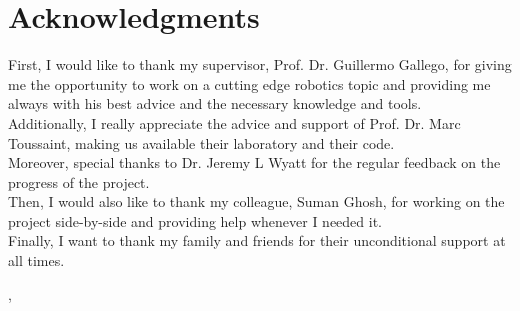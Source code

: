 \chapter*{Acknowledgments}

First, I would like to thank my supervisor, Prof. Dr. Guillermo Gallego, for giving me the opportunity to work on a cutting edge robotics topic and providing me always with his best advice and the necessary knowledge and tools.\\

Additionally, I really appreciate the advice and support of Prof. Dr. Marc Toussaint, making us available their laboratory and their code.\\

Moreover, special thanks to Dr. Jeremy L Wyatt for the regular feedback on the progress of the project.\\

Then, I would also like to thank my colleague, Suman Ghosh, for working on the project side-by-side and providing help whenever I needed it.\\

Finally, I want to thank my family and friends for their unconditional support at all times.

\vspace{0.5in}
\begin{flushright}
  \metaCity, \metaDate
\end{flushright}
